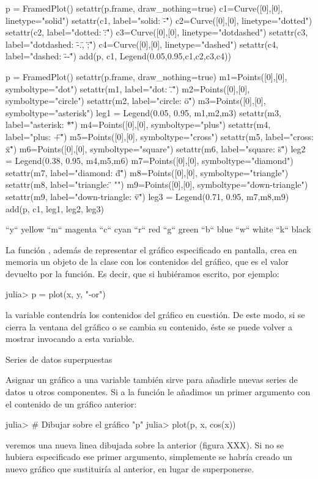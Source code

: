 ﻿\documentclass[spanish]{article}
\begin{document}
p = FramedPlot()
setattr(p.frame, draw_nothing=true)
c1=Curve([0],[0], linetype="solid")
setattr(c1, label="solid: \"-\"")
c2=Curve([0],[0], linetype="dotted")
setattr(c2, label="dotted: \":\"")
c3=Curve([0],[0], linetype="dotdashed")
setattr(c3, label="dotdashed: \"-.\", \";\"")
c4=Curve([0],[0], linetype="dashed")
setattr(c4, label="dashed: \"--\"")
add(p, c1, Legend(0.05,0.95,{c1,c2,c3,c4}))

p = FramedPlot()
setattr(p.frame, draw_nothing=true)
m1=Points([0],[0], symboltype="dot")
setattr(m1, label="dot: \".\"")
m2=Points([0],[0], symboltype="circle")
setattr(m2, label="circle: \"o\"")
m3=Points([0],[0], symboltype="asterisk")
leg1 = Legend(0.05, 0.95, {m1,m2,m3})
setattr(m3, label="asterisk: \"*\"")
m4=Points([0],[0], symboltype="plus")
setattr(m4, label="plus: \"+\"")
m5=Points([0],[0], symboltype="cross")
setattr(m5, label="cross: \"x\"")
m6=Points([0],[0], symboltype="square")
setattr(m6, label="square: \"s\"")
leg2 = Legend(0.38, 0.95, {m4,m5,m6})
m7=Points([0],[0], symboltype="diamond")
setattr(m7, label="diamond: \"d\"")
m8=Points([0],[0], symboltype="triangle")
setattr(m8, label="triangle: \"^^\"")
m9=Points([0],[0], symboltype="down-triangle")
setattr(m9, label="down-triangle: \"v\"")
leg3 = Legend(0.71, 0.95, {m7,m8,m9})
add(p, c1, leg1, leg2, leg3)

``y``     yellow
``m``     magenta
``c``     cyan
``r``     red
``g``     green
``b``     blue
``w``     white
``k``     black

La función , además de representar el gráfico especificado
en pantalla, crea en memoria un objeto de la clase  con
los contenidos del gráfico, que es el valor devuelto por la función.
Es decir, que si hubiéramos escrito, por ejemplo:

julia> p = plot(x, y, "-or")

la variable  contendría los contenidos del gráfico en cuestión. 
De este modo, si se cierra la ventana del gráfico o se cambia su contenido,
éste se puede volver a mostrar invocando a esta variable.


Series de datos superpuestas

Asignar un gráfico a una variable también sirve para añadirle nuevas
series de datos u otros componentes. Si a la función  le añadimos un
primer argumento con el contenido de un gráfico anterior:

julia> # Dibujar sobre el gráfico "p"
julia> plot(p, x, cos(x))

veremos una nueva linea dibujada sobre la anterior (figura XXX). Si no se
hubiera especificado ese primer argumento, simplemente se habría creado
un nuevo gráfico que sustituiría al anterior, en lugar de superponerse.
\end{document}
